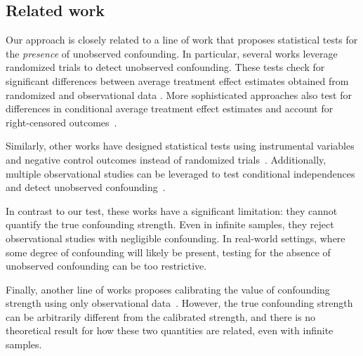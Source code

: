 \subsection{Related work}
\label{sec:related_work}
Our approach is closely related to a line of work that proposes statistical tests for the \emph{presence} of unobserved confounding. In particular, several works leverage randomized trials to detect unobserved confounding. These tests check for significant differences between average treatment effect estimates obtained from randomized and observational data \citep{viele2014use,yangelastic, morucci2023double,hussain2022falsification}. More sophisticated approaches also test for differences in conditional average treatment effect estimates \citep{hussain2023falsification} and account for right-censored outcomes~\citep{demirel2024benchmarking}. 


Similarly, other works have designed statistical tests using instrumental variables and negative control outcomes instead of randomized trials~\citep{lipsitch2010negative, de2014testing, donald2014testing,sofer2016negative}. Additionally, multiple observational studies can be leveraged to test conditional independences and detect unobserved confounding~\citep{karlsson2023detecting}.


In contrast to our test, these works have a significant limitation: they cannot quantify the true confounding strength. Even in infinite samples, they reject observational studies with negligible confounding. In real-world settings, where some degree of confounding will likely be present, testing for the absence of unobserved confounding can be too restrictive. 

Finally, another line of works proposes calibrating the value of confounding strength using only observational data~\citep{hsu2013calibrating,veitch2020sense}. However, the true confounding
 strength can be arbitrarily different from the calibrated strength, and there is no theoretical result for how these two quantities are related, even with infinite samples. 
 
